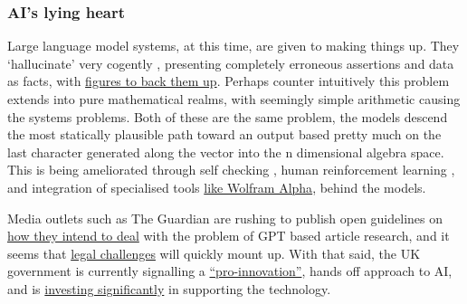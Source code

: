 \subsubsection{AI's lying heart}
Large language model systems, at this time, are given to making things up. They `hallucinate' very cogently \cite{azamfirei2023large}, presenting completely erroneous assertions and data as facts, with \href{https://news.artnet.com/art-world/chatgpt-art-theory-hal-foster-2263711}{figures to back them up}. Perhaps counter intuitively this problem extends into pure mathematical realms, with seemingly simple arithmetic causing the systems problems. Both of these are the same problem, the models descend the most statically plausible path toward an output based pretty much on the last character generated along the vector into the n dimensional algebra space. This is being ameliorated through self checking \cite{manakul2023selfcheckgpt}, human reinforcement learning \cite{ouyang2022training}, and integration of specialised tools \href{https://writings.stephenwolfram.com/2023/01/wolframalpha-as-the-way-to-bring-computational-knowledge-superpowers-to-chatgpt/}{like Wolfram Alpha}, behind the models.\par 
Media outlets such as The Guardian are rushing to publish open guidelines on \href{https://www.theguardian.com/commentisfree/2023/apr/06/ai-chatgpt-guardian-technology-risks-fake-article?}{how they intend to deal} with the problem of GPT based article research, and it seems that \href{https://www.bbc.co.uk/news/technology-65202597}{legal challenges} will quickly mount up. With that said, the UK government is currently signalling a \href{https://www.gov.uk/government/publications/ai-regulation-a-pro-innovation-approach}{``pro-innovation''}, hands off approach to AI, and is \href{https://www.gov.uk/government/news/initial-100-million-for-expert-taskforce-to-help-uk-build-and-adopt-next-generation-of-safe-ai}{investing significantly} in supporting the technology.
